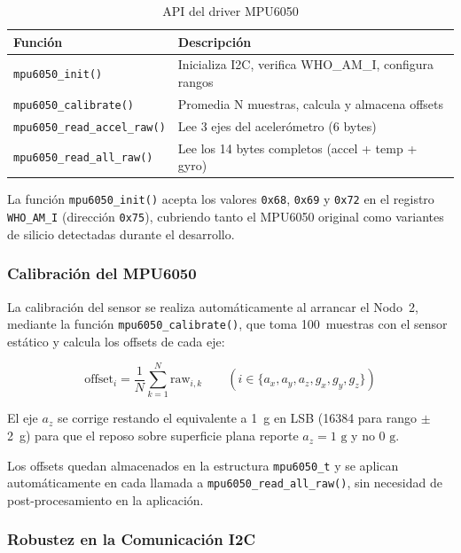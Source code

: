 \documentclass[10pt,twocolumn,a4paper]{article}
\begin{document}
\begin{table}[H]
\centering
\caption{API del driver MPU6050}
\label{tab:api_mpu}
\scriptsize
\begin{tabular}{p{2.8cm}p{3.9cm}}
\toprule
\textbf{Función} & \textbf{Descripción} \\
\midrule
\texttt{mpu6050\_init()} & Inicializa I2C, verifica WHO\_AM\_I, configura rangos \\
\texttt{mpu6050\_calibrate()} & Promedia N muestras, calcula y almacena offsets \\
\texttt{mpu6050\_read\_accel\_raw()} & Lee 3 ejes del acelerómetro (6 bytes) \\
\texttt{mpu6050\_read\_all\_raw()} & Lee los 14 bytes completos (accel + temp + gyro) \\
\bottomrule
\end{tabular}
\end{table}

La función \texttt{mpu6050\_init()} acepta los valores \texttt{0x68},
\texttt{0x69} y \texttt{0x72} en el registro \texttt{WHO\_AM\_I}
(dirección \texttt{0x75}), cubriendo tanto el MPU6050 original como
variantes de silicio detectadas durante el desarrollo.

\subsubsection{Calibración del MPU6050}

La calibración del sensor se realiza automáticamente al arrancar el
Nodo~2, mediante la función \texttt{mpu6050\_calibrate()}, que toma
100~muestras con el sensor estático y calcula los offsets de cada eje:

\begin{equation}
  \text{offset}_i = \frac{1}{N}\sum_{k=1}^{N} \text{raw}_{i,k} \qquad
  (i \in \{a_x, a_y, a_z, g_x, g_y, g_z\})
  \label{eq:calib}
\end{equation}

El eje $a_z$ se corrige restando el equivalente a 1~g en LSB
(16384 para rango $\pm$2~g) para que el reposo sobre superficie plana
reporte $a_z = 1\text{ g}$ y no $0\text{ g}$.

Los offsets quedan almacenados en la estructura \texttt{mpu6050\_t}
y se aplican automáticamente en cada llamada a
\texttt{mpu6050\_read\_all\_raw()}, sin necesidad de post-procesamiento
en la aplicación.

\subsubsection{Robustez en la Comunicación I2C}
\end{document}
